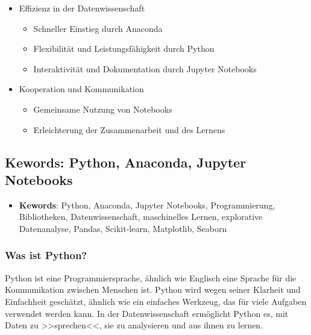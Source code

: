 \documentclass{vorlage-design-main}
\begin{document}
\begin{enumerate}
  \begin{itemize}
  
  \item
    Effizienz in der Datenwissenschaft

    \begin{itemize}
    
    \item
      Schneller Einstieg durch Anaconda
    \item
      Flexibilität und Leistungsfähigkeit durch Python
    \item
      Interaktivität und Dokumentation durch Jupyter Notebooks
    \end{itemize}
  \item
    Kooperation und Kommunikation

    \begin{itemize}
    
    \item
      Gemeinsame Nutzung von Notebooks
    \item
      Erleichterung der Zusammenarbeit und des Lernens
    \end{itemize}
  \end{itemize}
\end{enumerate}

\newpage

\subsection{Kewords: Python, Anaconda, Jupyter
Notebooks}\label{kewords-python-anaconda-jupyter-notebooks}

\begin{itemize}

\item
  \textbf{Kewords}: Python, Anaconda, Jupyter Notebooks, Programmierung,
  Bibliotheken, Datenwissenschaft, maschinelles Lernen, explorative
  Datenanalyse, Pandas, Scikit-learn, Matplotlib, Seaborn
\end{itemize}

\subsubsection{Was ist Python?}\label{was-ist-python}

Python ist eine Programmiersprache, ähnlich wie Englisch eine Sprache
für die Kommunikation zwischen Menschen ist. Python wird wegen seiner
Klarheit und Einfachheit geschätzt, ähnlich wie ein einfaches Werkzeug,
das für viele Aufgaben verwendet werden kann. In der Datenwissenschaft
ermöglicht Python es, mit Daten zu >>sprechen<<, sie zu analysieren und
aus ihnen zu lernen.
\end{document}
